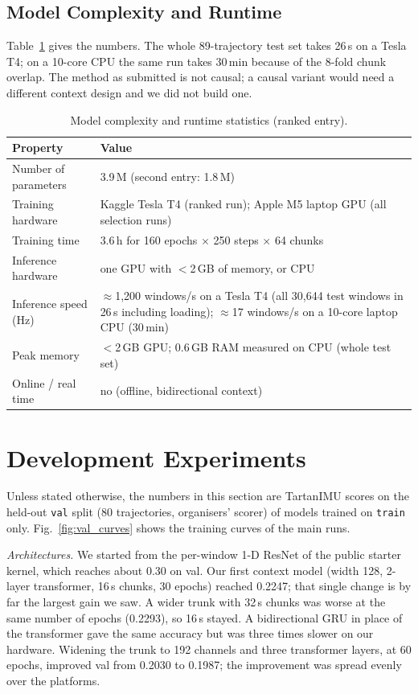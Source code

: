 \documentclass[letterpaper,10pt,conference]{ieeeconf}
\begin{document}
\subsection{Model Complexity and Runtime}
Table~\ref{tab:runtime} gives the numbers. The whole 89-trajectory test set takes 26\,s on a Tesla T4; on a 10-core CPU the same run takes 30\,min because of the 8-fold chunk overlap. The method as submitted is not causal; a
causal variant would need a different context design and we did not build one.
\begin{table}[htbp]
    \centering\footnotesize
    \caption{Model complexity and runtime statistics (ranked entry).}
    \begin{tabular}{p{2.6cm} p{5.2cm}}
        \toprule Property & Value \\ \midrule
        Number of parameters & 3.9\,M (second entry: 1.8\,M) \\
        Training hardware & Kaggle Tesla T4 (ranked run); Apple M5 laptop GPU (all selection runs) \\
        Training time & 3.6\,h for 160 epochs $\times$ 250 steps $\times$ 64 chunks \\
        Inference hardware & one GPU with $<$2\,GB of memory, or CPU \\
        Inference speed (Hz) & $\approx$1{,}200 windows/s on a Tesla T4 (all 30{,}644 test windows in 26\,s including loading); $\approx$17 windows/s on a 10-core laptop CPU (30\,min) \\
        Peak memory & $<$2\,GB GPU; 0.6\,GB RAM measured on CPU (whole test set) \\
        Online / real time & no (offline, bidirectional context) \\
        \bottomrule
    \end{tabular}
    \label{tab:runtime}
\end{table}

\section{Development Experiments}
\label{sec:devexp}
Unless stated otherwise, the numbers in this section are TartanIMU scores on the held-out \texttt{val} split (80
trajectories, organisers' scorer) of models trained on \texttt{train} only. Fig.~\ref{fig:val_curves} shows the
training curves of the main runs.

\emph{Architectures.} We started from the per-window 1-D ResNet of the public starter kernel, which reaches about
0.30 on val. Our first context model (width 128, 2-layer transformer, 16\,s chunks, 30 epochs) reached 0.2247; that
single change is by far the largest gain we saw. A wider trunk with 32\,s chunks was worse at the same number of
epochs (0.2293), so 16\,s stayed. A bidirectional GRU in place of the transformer gave the same accuracy but was three
times slower on our hardware. Widening the trunk to 192 channels and three transformer layers, at 60 epochs, improved
val from 0.2030 to 0.1987; the improvement was spread evenly over the platforms.
\end{document}
